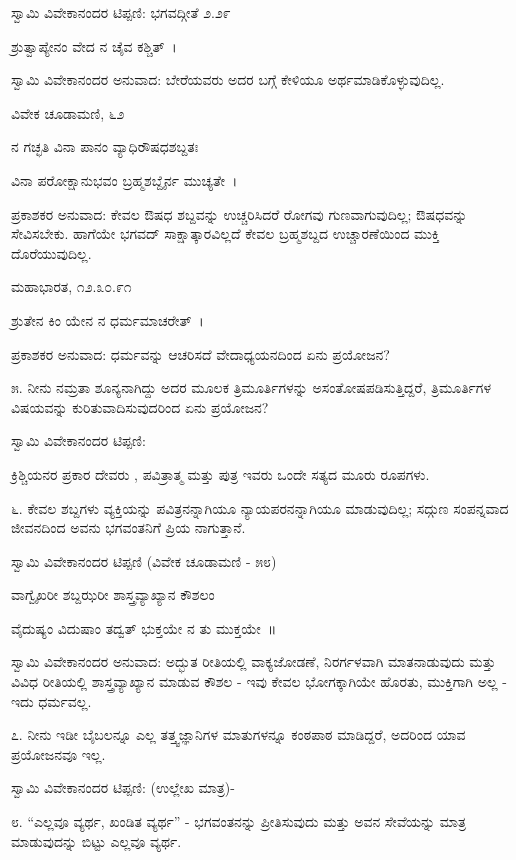 ಸ್ವಾಮಿ ವಿವೇಕಾನಂದರ ಟಿಪ್ಪಣಿ: ಭಗವದ್ಗೀತೆ ೨.೨೯

ಶ್ರುತ್ವಾಪ್ಯೇನಂ ವೇದ ನ ಚೈವ ಕಶ್ಚಿತ್~।

ಸ್ವಾಮಿ ವಿವೇಕಾನಂದರ ಅನುವಾದ: ಬೇರೆಯವರು ಅದರ ಬಗ್ಗೆ ಕೇಳಿಯೂ ಅರ್ಥಮಾಡಿಕೊಳ್ಳುವುದಿಲ್ಲ.

ವಿವೇಕ ಚೂಡಾಮಣಿ, ೬೨

ನ ಗಚ್ಛತಿ ವಿನಾ ಪಾನಂ ವ್ಯಾಧಿರೌಷಧಶಬ್ದತಃ

ವಿನಾ ಪರೋಕ್ಷಾನುಭವಂ ಬ್ರಹ್ಮಶಬ್ದೈರ್ನ ಮುಚ್ಯತೇ~।

ಪ್ರಕಾಶಕರ ಅನುವಾದ: ಕೇವಲ ಔಷಧ ಶಬ್ದವನ್ನು ಉಚ್ಚರಿಸಿದರೆ ರೋಗವು ಗುಣವಾಗುವುದಿಲ್ಲ; ಔಷಧವನ್ನು ಸೇವಿಸಬೇಕು. ಹಾಗೆಯೇ ಭಗವದ್ ಸಾಕ್ಷಾತ್ಕಾರವಿಲ್ಲದೆ ಕೇವಲ ಬ್ರಹ್ಮಶಬ್ದದ ಉಚ್ಚಾರಣೆಯಿಂದ ಮುಕ್ತಿ ದೊರೆಯುವುದಿಲ್ಲ.

ಮಹಾಭಾರತ, ೧೨.೩೦.೯೧

ಶ್ರುತೇನ ಕಿಂ ಯೇನ ನ ಧರ್ಮಮಾಚರೇತ್~।

ಪ್ರಕಾಶಕರ ಅನುವಾದ: ಧರ್ಮವನ್ನು ಆಚರಿಸದೆ ವೇದಾಧ್ಯಯನದಿಂದ ಏನು ಪ್ರಯೋಜನ?

೫. ನೀನು ನಮ್ರತಾ ಶೂನ್ಯನಾಗಿದ್ದು ಅದರ ಮೂಲಕ ತ್ರಿಮೂರ್ತಿಗಳನ್ನು ಅಸಂತೋಷಪಡಿಸುತ್ತಿದ್ದರೆ, ತ್ರಿಮೂರ್ತಿಗಳ ವಿಷಯವನ್ನು ಕುರಿತುವಾದಿಸುವುದರಿಂದ ಏನು ಪ್ರಯೋಜನ? 

ಸ್ವಾಮಿ ವಿವೇಕಾನಂದರ ಟಿಪ್ಪಣಿ:

ಕ್ರಿಶ್ಚಿಯನರ ಪ್ರಕಾರ ದೇವರು , ಪವಿತ್ರಾತ್ಮ  ಮತ್ತು ಪುತ್ರ  ಇವರು ಒಂದೇ ಸತ್ಯದ ಮೂರು ರೂಪಗಳು.

೬. ಕೇವಲ ಶಬ್ದಗಳು ವ್ಯಕ್ತಿಯನ್ನು ಪವಿತ್ರನನ್ನಾಗಿಯೂ ನ್ಯಾಯಪರನನ್ನಾಗಿಯೂ ಮಾಡುವುದಿಲ್ಲ; ಸದ್ಗುಣ ಸಂಪನ್ನವಾದ ಜೀವನದಿಂದ ಅವನು ಭಗವಂತನಿಗೆ ಪ್ರಿಯ ನಾಗುತ್ತಾನೆ. 

ಸ್ವಾಮಿ ವಿವೇಕಾನಂದರ ಟಿಪ್ಪಣಿ (ವಿವೇಕ ಚೂಡಾಮಣಿ - ೫೮)

ವಾಗ್ವೈಖರೀ ಶಬ್ದಝರೀ ಶಾಸ್ತ್ರವ್ಯಾಖ್ಯಾನ ಕೌಶಲಂ

ವೈದುಷ್ಯಂ ವಿದುಷಾಂ ತದ್ವತ್ ಭುಕ್ತಯೇ ನ ತು ಮುಕ್ತಯೇ~॥

ಸ್ವಾಮಿ ವಿವೇಕಾನಂದರ ಅನುವಾದ: ಅದ್ಭುತ ರೀತಿಯಲ್ಲಿ ವಾಕ್ಯಜೋಡಣೆ, ನಿರರ್ಗಳವಾಗಿ ಮಾತನಾಡುವುದು ಮತ್ತು ವಿವಿಧ ರೀತಿಯಲ್ಲಿ ಶಾಸ್ತ್ರವ್ಯಾಖ್ಯಾನ ಮಾಡುವ ಕೌಶಲ - ಇವು ಕೇವಲ ಭೋಗಕ್ಕಾಗಿಯೇ ಹೊರತು, ಮುಕ್ತಿಗಾಗಿ ಅಲ್ಲ - ಇದು ಧರ್ಮವಲ್ಲ.

೭. ನೀನು ಇಡೀ ಬೈಬಲನ್ನೂ ಎಲ್ಲ ತತ್ತ್ವಜ್ಞಾನಿಗಳ ಮಾತುಗಳನ್ನೂ ಕಂಠಪಾಠ ಮಾಡಿದ್ದರೆ, ಅದರಿಂದ ಯಾವ ಪ್ರಯೋಜನವೂ ಇಲ್ಲ. 

ಸ್ವಾಮಿ ವಿವೇಕಾನಂದರ ಟಿಪ್ಪಣಿ: (ಉಲ್ಲೇಖ ಮಾತ್ರ)- 

೮. “ಎಲ್ಲವೂ ವ್ಯರ್ಥ, ಖಂಡಿತ ವ್ಯರ್ಥ”  - ಭಗವಂತನನ್ನು ಪ್ರೀತಿಸುವುದು ಮತ್ತು ಅವನ ಸೇವೆಯನ್ನು ಮಾತ್ರ ಮಾಡುವುದನ್ನು ಬಿಟ್ಟು ಎಲ್ಲವೂ ವ್ಯರ್ಥ. 

